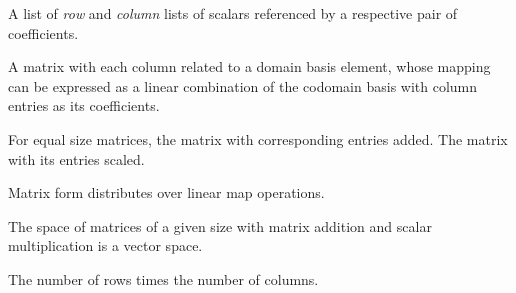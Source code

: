 \begin{multicols}{3}
  A list of \textit{row} and \textit{column} lists of scalars referenced by a respective pair of coefficients.
  
  A matrix with each column related to a domain basis element, whose mapping can be expressed as a linear combination of the codomain basis with column entries as its coefficients.

  For equal size matrices, the matrix with corresponding entries added.
  The matrix with its entries scaled.
  
  Matrix form distributes over linear map operations.
  
  The space of matrices of a given size with matrix addition and scalar multiplication is a vector space.
  
  The number of rows times the number of columns.
  

\end{multicols}
